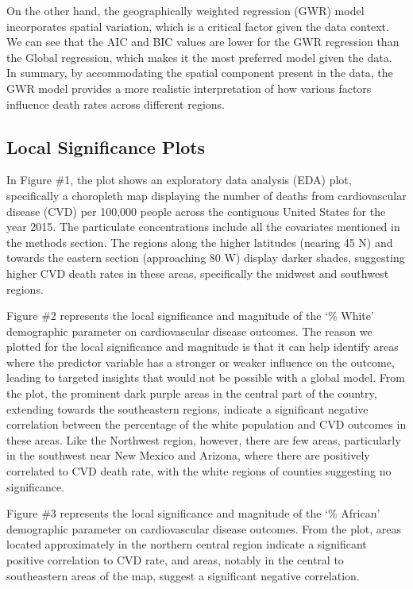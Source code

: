 \documentclass[
]{article}
\begin{document}
On the other hand, the geographically weighted regression (GWR) model
incorporates spatial variation, which is a critical factor given the
data context. We can see that the AIC and BIC values are lower for the
GWR regression than the Global regression, which makes it the most
preferred model given the data.~ In summary, by accommodating the
spatial component present in the data, the GWR model provides a more
realistic interpretation of how various factors influence death rates
across different regions.

\subsection{Local Significance Plots}\label{local-significance-plots}

In Figure \#1, the plot shows an exploratory data analysis (EDA) plot,
specifically a choropleth map displaying the number of deaths from
cardiovascular disease (CVD) per 100,000 people across the contiguous
United States for the year 2015. The particulate concentrations include
all the covariates mentioned in the methods section. The regions along
the higher latitudes (nearing 45 N) and towards the eastern section
(approaching 80 W) display darker shades, suggesting higher CVD death
rates in these areas, specifically the midwest and southwest regions.~

Figure \#2 represents the local significance and magnitude of the `\%
White' demographic parameter on cardiovascular disease outcomes. The
reason we plotted for the local significance and magnitude is that it
can help identify areas where the predictor variable has a stronger or
weaker influence on the outcome, leading to targeted insights that would
not be possible with a global model. From the plot, the prominent dark
purple areas in the central part of the country, extending towards the
southeastern regions, indicate a significant negative correlation
between the percentage of the white population and CVD outcomes in these
areas. Like the Northwest region, however, there are few areas,
particularly in the southwest near New Mexico and Arizona, where there
are positively correlated to CVD death rate, with the white regions of
counties suggesting no significance.~~

Figure \#3 represents the local significance and magnitude of the `\%
African' demographic parameter on cardiovascular disease outcomes. From
the plot, areas located approximately in the northern central region
indicate a significant positive correlation to CVD rate, and areas,
notably in the central to southeastern areas of the map, suggest a
significant negative correlation.
\end{document}
